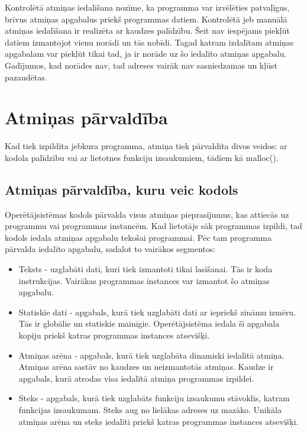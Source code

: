  Kontrolētā atmiņas iedalīšana nozīme, ka programma var izvēlēties patvaļīgus, brīvus atmiņas apgabalus priekš programmas datiem. 
Kontrolētā jeb manuālā atmiņas iedalīšana ir realizēta ar kaudzes palīdzību. 
Šeit nav iespējams piekļūt datiem izmantojot vienu norādi un tās nobīdi. 
Tagad katram izdalītam atmiņas apgabalam var piekļūt tikai tad, ja ir norāde uz šo iedalīto atmiņas apgabalu. 
Gadījumos, kad norādes nav, tad adreses vairāk nav sasniedzamas un kļūst pazaudētas.


\section{Atmiņas pārvaldība}
Kad tiek izpildīta jebkura programma, atmiņa tiek pārvaldīta divos veidos: ar kodola palīdzību vai ar lietotnes funkciju izsaukumiem, tādiem kā malloc().

\subsection{Atmiņas pārvaldība, kuru veic kodols}
Operētājsistēmas kodols pārvalda  visus atmiņas pieprasījumus, kas attiecās uz programmu vai programmas instancēm.
Kad lietotājs sāk programmas izpildi, tad kodols iedala atmiņas apgabalu tekošai programmai.
Pēc tam programma pārvalda iedalīto apgabalu, sadalot to vairākos segmentos: 
\begin{itemize}
	\item   Teksts - uzglabāti dati, kuri tiek izmantoti tikai lasīšanai. Tās ir koda instrukcijas. 
    Vairākas programmas instances var izmantot šo atmiņas apgabalu.
    \item Statiskie dati - apgabals, kurā tiek uzglabāti dati ar iepriekš zināmu izmēru. Tās ir globālie un statiskie mainīgie.
    Operētājsistēma iedala šī apgabala kopiju priekš katras programmas instances atsevišķi.
    \item Atmiņas arēna - apgabals, kurā tiek uzglabāta dinamiski iedalītā atmiņa. Atmiņas arēna sastāv no kaudzes un neizmantotās atmiņas.
    Kaudze ir apgabals, kurā atrodas visa iedalītā atmiņa programmas izpildei.
    \item Steks - apgabals, kurā tiek uzglabāts funkciju izsaukumu stāvoklis, katram funkcijas izsaukumam. Steks aug no lielākas adreses uz mazāko. 
    Unikāla atmiņas arēna un steks iedalīti priekš katras programmas instances atsevišķi.
\end{itemize} 

